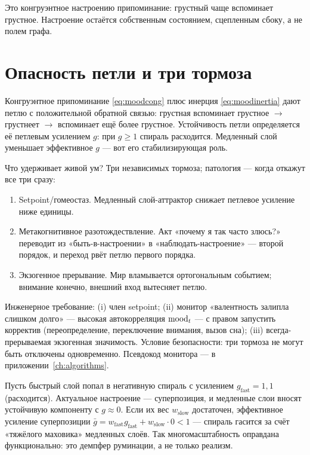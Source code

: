 Это конгруэнтное настроению припоминание: грустный чаще вспоминает грустное.
Настроение остаётся собственным состоянием, сцепленным сбоку, а не полем
графа.

\section{Опасность петли и три тормоза}

\begin{pitfall}[Руминация]
Конгруэнтное припоминание \eqref{eq:moodcong} плюс инерция
\eqref{eq:moodinertia} дают петлю с положительной обратной связью: грустная
вспоминает грустное $\to$ грустнеет $\to$ вспоминает ещё более грустное.
Устойчивость петли определяется её петлевым усилением $g$: при $g \ge 1$
спираль расходится. Медленный слой уменьшает эффективное $g$ --- вот его
стабилизирующая роль.
\end{pitfall}

Что удерживает живой ум? Три независимых тормоза; патология --- когда откажут
все три сразу:
\begin{enumerate}
\item Setpoint/гомеостаз. Медленный слой-аттрактор снижает петлевое усиление
ниже единицы.
\item Метакогнитивное разотождествление. Акт «почему я так часто злюсь?»
переводит из «быть-в-настроении» в «наблюдать-настроение» --- второй порядок,
и переход рвёт петлю первого порядка.
\item Экзогенное прерывание. Мир вламывается ортогональным событием;
внимание конечно, внешний вход вытесняет петлю.
\end{enumerate}

Инженерное требование: (i) член setpoint; (ii) монитор «валентность залипла
слишком долго» --- высокая автокорреляция $\mathrm{mood}_t$ --- с правом запустить
корректив (переопределение, переключение внимания, вызов сна); (iii)
всегда-прерываемая экзогенная значимость. Условие безопасности: три тормоза не
могут быть отключены одновременно. Псевдокод монитора ---
в приложении~\ref{ch:algorithms}.

\begin{intuition}
Пусть быстрый слой попал в негативную спираль с усилением
$g_{\text{fast}} = 1{,}1$ (расходится). Актуальное настроение --- суперпозиция, и
медленные слои вносят устойчивую компоненту с $g \approx 0$. Если их вес
$w_{\text{slow}}$ достаточен, эффективное усиление суперпозиции
$\bar{g} = w_{\text{fast}}g_{\text{fast}} + w_{\text{slow}}\cdot 0 < 1$ ---
спираль гасится за счёт «тяжёлого маховика» медленных слоёв. Так
многомасштабность оправдана функционально: это демпфер руминации, а не только
реализм.
\end{intuition}

